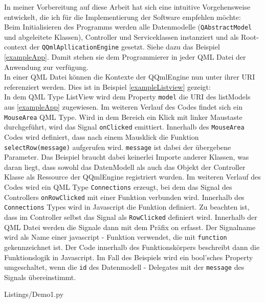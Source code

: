 \vspace{1cm}
In meiner Vorbereitung auf diese Arbeit hat sich eine intuitive Vorgehensweise entwickelt, die ich für die Implementierung
der Software empfehlen möchte:\\
\vspace{1cm}
Beim Initialisieren des Programms werden alle Datenmodelle (\verb|QAbstractModel| und abgeleitete Klassen), Controller
und Serviceklassen instanziert und als Root-context der \verb|QQmlApllicationEngine| gesetzt.
Siehe dazu das Beispiel \ref{exampleApp}.
Damit stehen sie dem Programmierer in jeder QML Datei der Anwendung zur verfügung.\\
In einer QML Datei können die Kontexte der QQmlEngine nun unter ihrer URI referenziert werden.
Dies ist in Beispiel \ref{exampleListview} gezeigt:\\
In dem QML Type \glqq ListView \grqq wird dem Property \verb|model| die URI des listModels aus \ref{exampleApp} zugewiesen.
Im weiteren Verlauf des Codes findet sich ein \verb|MouseArea| QML Type.
Wird in dem Bereich ein Klick mit linker Maustaste durchgeführt, wird das Signal \verb|onClicked| emittiert.
Innerhalb des \verb|MouseArea| Codes wird definiert, dass nach einem Mausklick die Funktion \verb|selectRow(message)|
aufgerufen wird. \verb|message| ist dabei der übergebene Parameter.
Das Beispiel braucht dabei keinerlei Importe anderer Klassen, was daran liegt, dass sowohl das DatenModell als
auch das Objekt der Controller Klasse als Ressource der QQmlEngine registriert wurden.
Im weiteren Verlauf des Codes wird ein QML Type \verb|Connections| erzeugt, bei dem das Signal des Controllers \verb|onRowClicked|
mit einer Funktion verbunden wird.
Innerhalb des \verb|Connections| Types wird in Javascript die Funktion definiert.
Zu beachten ist, dass im Controller selbst das Signal als \verb|RowClicked| definiert wird.
Innerhalb der QML Datei werden die Signale dann mit dem Präfix \glqq on \grqq erfasst.
Der Signalname wird als Name einer javascript - Funktion verwendet, die mit \verb|function| gekennzeichnet ist.
Der Code innerhalb des Funktionskörpers beschreibt dann die Funktionslogik in Javascript.
Im Fall des Beispiels wird ein bool'sches Property umgeschaltet, wenn die \verb|id| des Datenmodell - Delegates mit der
\verb|message| des Signals übereinstimmt.

\lstset{
    basicstyle=\small\ttfamily
}
\newpage

{Listings/Demo1.py}\label{exampleApp}

